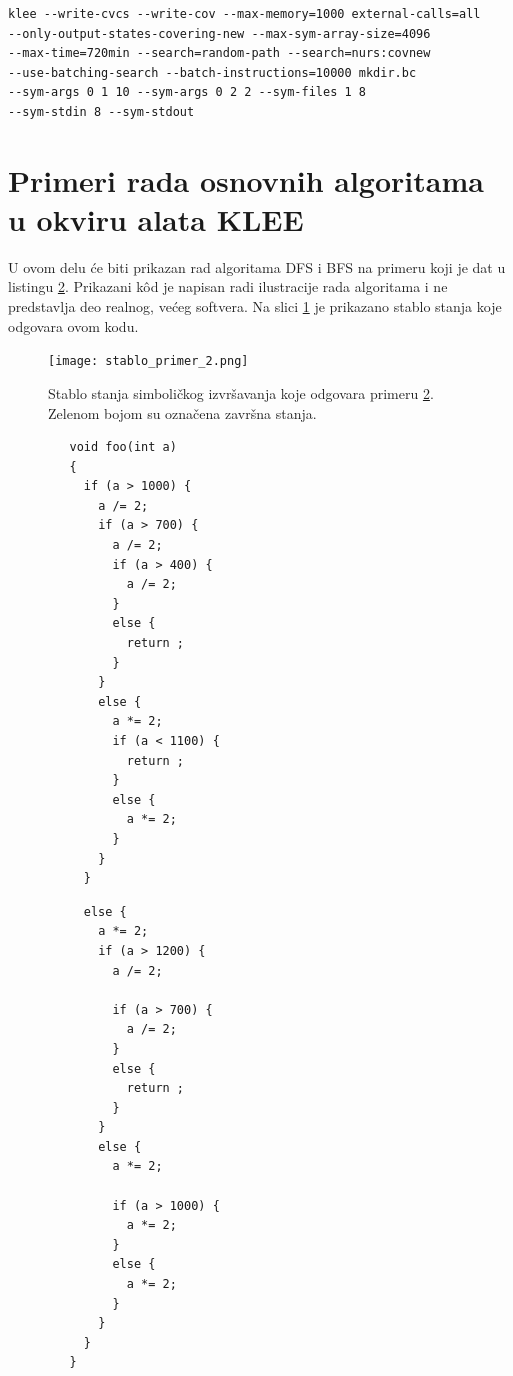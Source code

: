 \documentclass[12pt,oneside]{memoir}
\begin{document}
\begin{lstlisting}[caption={Primer pokretanja alata KLEE}, label={lst:pokretanje_klee}, captionpos=b]
klee --write-cvcs --write-cov --max-memory=1000 external-calls=all
--only-output-states-covering-new --max-sym-array-size=4096 
--max-time=720min --search=random-path --search=nurs:covnew 
--use-batching-search --batch-instructions=10000 mkdir.bc 
--sym-args 0 1 10 --sym-args 0 2 2 --sym-files 1 8 
--sym-stdin 8 --sym-stdout
\end{lstlisting}

\section{Primeri rada osnovnih algoritama u okviru alata KLEE} \label{osnovni_algoritmi}
U ovom delu će biti prikazan rad algoritama DFS i BFS na primeru koji je dat u listingu \ref{lst:primer_KLEE}. Prikazani k\^od je napisan radi ilustracije rada algoritama i ne predstavlja deo realnog, većeg softvera. Na slici \ref{fig:moj_primer} je prikazano stablo stanja koje odgovara ovom kodu. 

\begin{figure}[ht]
    \centering
    \texttt{[image: stablo\_primer\_2.png]}
    \caption{Stablo stanja simboličkog izvršavanja koje odgovara primeru \ref{lst:primer_KLEE}. Zelenom bojom su označena završna stanja.}
    \label{fig:moj_primer}
\end{figure}

\begin{figure}
\noindent\begin{minipage}[t]{.45\textwidth}
\begin{lstlisting}
   void foo(int a) 
   {
     if (a > 1000) {
       a /= 2;
       if (a > 700) {
         a /= 2;
         if (a > 400) {
           a /= 2;
         }
         else {
           return ;
         }
       }
       else {
         a *= 2;
         if (a < 1100) {
           return ;
         }
         else {
           a *= 2;
         }
       }
     }
\end{lstlisting}
\end{minipage}\hfill
\begin{minipage}[t]{.45\textwidth}
\begin{lstlisting}
     else {
       a *= 2;
       if (a > 1200) {
         a /= 2;

         if (a > 700) {
           a /= 2;
         }
         else {
           return ;
         }
       }
       else {
         a *= 2;

         if (a > 1000) {
           a *= 2;
         }
         else {
           a *= 2;
         }
       }
     }
   }
\end{lstlisting}
\end{minipage}
\label{lst:primer_KLEE}
\end{figure}
\end{document}
